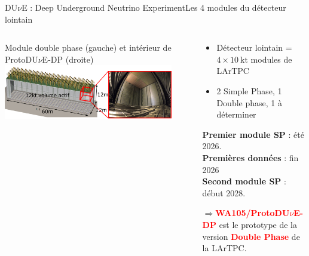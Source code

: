 \begin{frame}{DU$\nu$E : Deep Underground Neutrino Experiment}{Les 4 modules du détecteur lointain}
\begin{scriptsize}
\begin{columns}
\begin{column}{0.55\textwidth}
                    \centering Module double phase (gauche) et intérieur de ProtoDU$\nu$E-DP (droite)\\
                    \includegraphics[width=0.9\textwidth]{./pictures/module_DP.png}
                \end{column}
                \begin{column}{0.45\textwidth}
                    \begin{itemize}
                        \item Détecteur lointain = $4\times\SI{10}{\kilo\tonne}$ modules de LArTPC
                        \item 2 Simple Phase, 1 Double phase, 1 à déterminer
                    \end{itemize}\vspace{0.4cm}
                    \textbf{Premier module SP} : été 2026.\\
                    \textbf{Premières données} : fin 2026\\
                    \textbf{Second module SP} : début 2028.\\\vspace{0.4cm}

                    $\Rightarrow$\textcolor{red}{\textbf{WA105/ProtoDU$\nu$E-DP}} est le prototype de la version \textcolor{red}{\textbf{Double Phase}} de la LArTPC.\\
                \end{column}
            \end{columns}
        \end{scriptsize}
    \end{frame}
        
